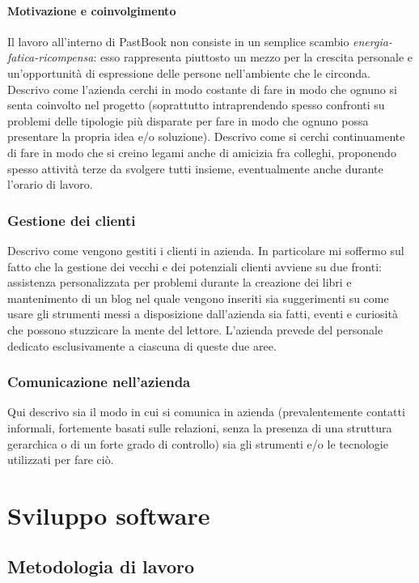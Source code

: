 				\paragraph{Motivazione e coinvolgimento}
					Il lavoro all'interno di PastBook non consiste in un semplice scambio \emph{energia-fatica-ricompensa}: esso
				rappresenta piuttosto un mezzo per la crescita personale e un'opportunità di espressione delle persone nell'ambiente
				che le circonda.\\
					Descrivo come l'azienda cerchi in modo costante di fare in modo che ognuno si senta coinvolto nel progetto
					(soprattutto intraprendendo spesso confronti su problemi delle tipologie più disparate per fare in modo che
					ognuno possa presentare la propria idea e/o soluzione).
					Descrivo come si cerchi continuamente di fare in modo che si creino legami anche di amicizia fra colleghi,
					proponendo spesso attività terze da svolgere tutti insieme, eventualmente anche durante l'orario di lavoro.
			\subsubsection{Gestione dei clienti}
				Descrivo come vengono gestiti i clienti in azienda. In particolare mi soffermo sul fatto che la gestione dei vecchi
				e dei potenziali clienti avviene su due fronti: assistenza personalizzata per problemi durante la creazione dei libri
				e mantenimento di un blog nel quale vengono inseriti sia suggerimenti su come usare gli strumenti messi a
				disposizione dall'azienda sia fatti, eventi e curiosità che possono stuzzicare la mente del lettore. L'azienda
				prevede del personale dedicato esclusivamente a ciascuna di queste due aree.
			\subsubsection{Comunicazione nell'azienda}
				Qui descrivo sia il modo in cui si comunica in azienda (prevalentemente contatti informali, fortemente basati sulle
				relazioni, senza la presenza di una struttura gerarchica o di un forte grado di controllo) sia gli strumenti e/o le
				tecnologie utilizzati per fare ciò.
	\section{Sviluppo software}
		\subsection{Metodologia di lavoro}
